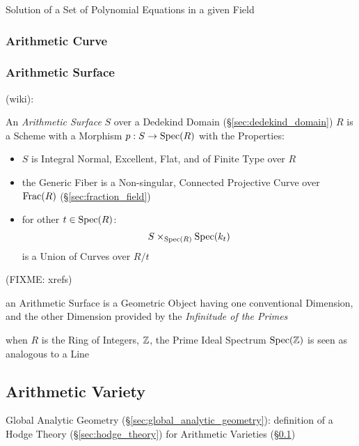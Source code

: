 Solution of a Set of Polynomial Equations in a given Field



\subsubsection{Arithmetic Curve}\label{sec:arithmetic_curve}


\subsubsection{Arithmetic Surface}\label{sec:arithmetic_surface}

(wiki):

An \emph{Arithmetic Surface} $S$ over a Dedekind Domain
(\S\ref{sec:dedekind_domain}) $R$ is a Scheme with a Morphism $p : S \rightarrow
\mathrm{Spec}(R)$ with the Properties:
\begin{itemize}
  \item $S$ is Integral Normal, Excellent, Flat, and of Finite Type over $R$
  \item the Generic Fiber is a Non-singular, Connected Projective Curve over
    $\mathrm{Frac}(R)$ (\S\ref{sec:fraction_field})
  \item for other $t \in \mathrm{Spec}(R)$:
    \[
      S \times_{\mathrm{Spec}(R)} \mathrm{Spec}(k_t)
    \]
    is a Union of Curves over $R / t$
\end{itemize}
(FIXME: xrefs)

an Arithmetic Surface is a Geometric Object having one conventional Dimension,
and the other Dimension provided by the \emph{Infinitude of the Primes}

when $R$ is the Ring of Integers, $\mathbb{Z}$, the Prime Ideal Spectrum
$\mathrm{Spec}(\mathbb{Z})$ is seen as analogous to a Line



\subsection{Arithmetic Variety}\label{sec:arithmetic_variety}

Global Analytic Geometry (\S\ref{sec:global_analytic_geometry}): definition of
a Hodge Theory (\S\ref{sec:hodge_theory}) for Arithmetic Varieties
(\S\ref{sec:arithmetic_variety})



